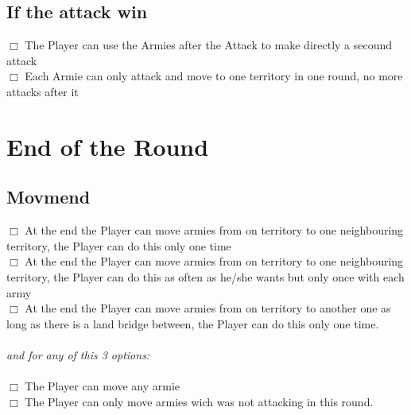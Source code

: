 \documentclass{article}
\begin{document}
\subsection{If the attack win}
$\Box$ The Player can use the Armies after the Attack to make directly a secound attack\\
$\Box$ Each Armie can only attack and move to one territory in one round, no more attacks after it

\section{End of the Round}
\subsection{Movmend}
$\Box$ At the end the Player can move armies from on territory to one neighbouring territory, the Player can do this only one time\\
$\Box$ At the end the Player can move armies from on territory to one neighbouring territory, the Player can do this as often as he/she wants but only once with each army\\
$\Box$ At the end the Player can move armies from on territory to another one as long as there is a land bridge between, the Player can do this only one time.\\
\\
\textit{and for any of this 3 options:}\\\\
$\Box$ The Player can move any armie\\
$\Box$ The Player can only move armies wich was not attacking in this round.
\end{document}
